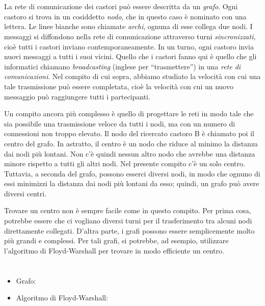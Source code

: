 {{\section*{\BrochureItsInformatics}
La rete di comunicazione dei castori può essere descritta da un \emph{grafo}. Ogni castoro si trova in un cosiddetto \emph{nodo}, che in questo caso è nominato con una lettera. Le linee bianche sono chiamate \emph{archi}, ognuna di esse collega due nodi. I messaggi si diffondono nella rete di comunicazione attraverso turni \emph{sincronizzati}, cioè tutti i castori inviano contemporaneamente. In un turno, ogni castoro invia nuovi messaggi a tutti i suoi vicini. Quello che i castori fanno qui è quello che gli informatici chiamano \emph{broadcasting} (inglese per “trasmettere”)  in una \emph{rete di comunicazioni}. Nel compito di cui sopra, abbiamo studiato la velocità con cui una tale trasmissione può essere completata, cioè la velocità con cui un nuovo messaggio può raggiungere tutti i partecipanti.

Un compito ancora più complesso è quello di progettare le reti in modo tale che sia possibile una trasmissione veloce da tutti i nodi, ma con un numero di connessioni non troppo elevato.
Il nodo del ricercato castoro B è chiamato poi il centro del grafo. In astratto, il centro è un nodo che riduce al minimo la distanza dai nodi più lontani. Non c’è quindi nessun altro nodo che avrebbe una distanza minore rispetto a tutti gli altri nodi. Nel presente compito c’è un solo centro. Tuttavia, a seconda del grafo, possono esserci diversi nodi, in modo che ognuno di essi minimizzi la distanza dai nodi più lontani da esso; quindi, un grafo può avere diversi centri.

Trovare un centro non è sempre facile come in questo compito. Per prima cosa, potrebbe essere che ci vogliano diversi turni per il trasferimento tra alcuni nodi direttamente collegati. D’altra parte, i grafi possono essere semplicemente molto più grandi e complessi. Per tali grafi, si potrebbe, ad esempio, utilizzare l’algoritmo di Floyd-Warshall per trovare in modo efficiente un centro.



\section*{\BrochureWebsitesAndKeywords}
{\raggedright
\begin{itemize}
  \item Grafo: \href{https://it.wikipedia.org/wiki/Grafo}{}
  \item Algoritmo di Floyd-Warshall: \href{https://it.wikipedia.org/wiki/Algoritmo_di_Floyd-Warshall}{}
\end{itemize}


}}}

